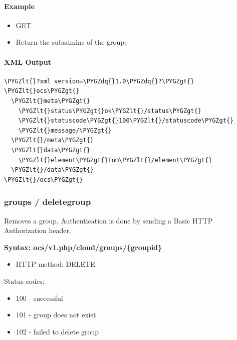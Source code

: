 \documentclass[letterpaper,10pt,english]{sphinxmanual}
\def\PYGZlt{\char`\<}
\def\PYGZgt{\char`\>}
\def\PYGZdq{\char`\"}
\begin{document}
\paragraph{Example}
\label{configuration_user/user_provisioning_api:id26}\begin{itemize}
\item {} 
GET

\item {} 
Return the subadmins of the group: 

\end{itemize}


\paragraph{XML Output}
\label{configuration_user/user_provisioning_api:id27}
\begin{Verbatim}[commandchars=\\\{\}]
\PYGZlt{}?xml version=\PYGZdq{}1.0\PYGZdq{}?\PYGZgt{}
\PYGZlt{}ocs\PYGZgt{}
  \PYGZlt{}meta\PYGZgt{}
    \PYGZlt{}status\PYGZgt{}ok\PYGZlt{}/status\PYGZgt{}
    \PYGZlt{}statuscode\PYGZgt{}100\PYGZlt{}/statuscode\PYGZgt{}
    \PYGZlt{}message/\PYGZgt{}
  \PYGZlt{}/meta\PYGZgt{}
  \PYGZlt{}data\PYGZgt{}
    \PYGZlt{}element\PYGZgt{}Tom\PYGZlt{}/element\PYGZgt{}
  \PYGZlt{}/data\PYGZgt{}
\PYGZlt{}/ocs\PYGZgt{}
\end{Verbatim}


\subsubsection{\textbf{groups / deletegroup}}
\label{configuration_user/user_provisioning_api:groups-deletegroup}
Removes a group. Authentication is done by
sending a Basic HTTP Authorization header.

\textbf{Syntax: ocs/v1.php/cloud/groups/\{groupid\}}
\begin{itemize}
\item {} 
HTTP method: DELETE

\end{itemize}

Status codes:
\begin{itemize}
\item {} 
100 - successful

\item {} 
101 - group does not exist

\item {} 
102 - failed to delete group

\end{itemize}
\end{document}
